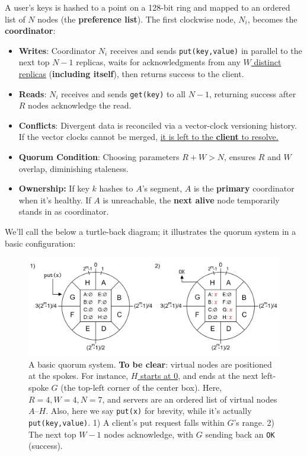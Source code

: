   \begin{Def}

    A user's keys is hashed to a point on a 128-bit ring and mapped to an ordered list of $N$ nodes (the \textbf{preference list}). The first clockwise node, $N_i$, becomes the \textbf{coordinator}:
      
        \begin{itemize}
          \item \textbf{Writes}: Coordinator $N_i$ receives and sends \texttt{put(key,value)} in parallel to the next top $N-1$ replicas, waits for acknowledgments from any \underline{$W$ distinct replicas} (\textbf{including itself}), then returns success to the client.
          \item \textbf{Reads}: $N_i$ receives and sends \texttt{get(key)} to all $N-1$, returning success after $R$ nodes acknowledge the read. 
          \item \textbf{Conflicts}: Divergent data is reconciled via a vector-clock versioning history. If the vector clocks cannot be merged, \underline{it is left to the \textbf{client} to resolve.}
          \item \textbf{Quorum Condition}: Choosing parameters $R + W > N$, ensures $R$ and $W$ overlap, diminishing staleness.
          \item \textbf{Ownership:} If key $k$ hashes to $A$'s segment, $A$ is the \textbf{primary} coordinator when it's healthy.  If $A$ is unreachable, the \textbf{next alive} node temporarily stands in as coordinator.

        \end{itemize}
      \end{Def}
      
      
    \newpage 
    \noindent
    We'll call the below a turtle-back diagram; it illustrates the quorum system in a basic configuration:
    \begin{figure}[h]
        
        \centering
        \includegraphics[width=\textwidth]{Sections/dyn/gossip.png}
        \caption{A basic quorum system. \textbf{To be clear}: virtual nodes are positioned at the spokes. For instance, \underline{$H$ starts at 0}, and ends at the next left-spoke $G$ (the top-left corner of the center box). Here, $R=4, W=4, N=7$, and servers are 
        an ordered list of virtual nodes $A$--$H$. Also, here we say \texttt{put(x)} for brevity, while it's actually \texttt{put(key,value)}.
        1) A client's put request falls within $G$'s range. 2) The next top $W-1$ nodes acknowledge, with $G$ sending back an \texttt{OK} (success).}
        \label{fig:quorum}
    \end{figure}


